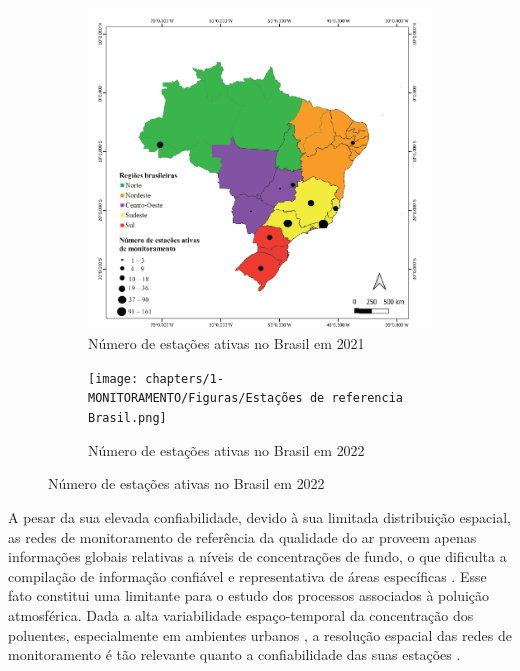 \begin{figure}[h]
    \centering
    \caption{Estado do monitoramento de referencia da qualidade do ar no Brasil}
    \begin{subfigure}{0.45\textwidth}
        \includegraphics[width=\textwidth]{chapters/1-MONITORAMENTO/Figuras/Monitoramento BR Vormittag.png}
        \caption{Número de estações ativas no Brasil em 2021}
        \label{fig:monit-stations-br-2021}
    \end{subfigure}
    \hfill
    \begin{subfigure}{0.5\textwidth}
        \texttt{[image: chapters/1-MONITORAMENTO/Figuras/Estações de referencia Brasil.png]}
        \caption{Número de estações ativas no Brasil em 2022}
        \label{fig:monit-stations-br-2022}
    \end{subfigure}
    \hfill
    \label{fig:monit-stations-br}
\end{figure}

A pesar da sua elevada confiabilidade, devido à sua limitada distribuição espacial, as redes de monitoramento de referência da qualidade do ar proveem apenas informações globais relativas a níveis de concentrações de fundo, o que dificulta a compilação de informação confiável e representativa de áreas específicas \cite{Kumar2015}. Esse fato constitui uma limitante para o estudo dos processos associados à poluição atmosférica. Dada a alta variabilidade espaço-temporal da concentração dos poluentes, especialmente em ambientes urbanos \cite{Mead2013TheNetworks}, a resolução espacial das redes de monitoramento é tão relevante quanto a confiabilidade das suas estações \cite{Jiao2016CommunityStates}.

